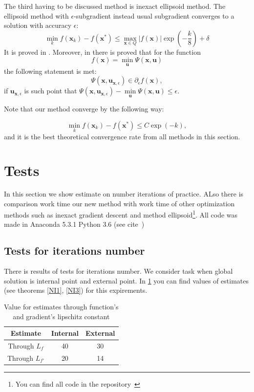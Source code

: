 \documentclass[12pt]{article}
\begin{document}
The third having to be discussed method is inexact ellipsoid method. The ellipsoid method with $\epsilon$-subgradient instead usual subgradient converges to a solution with accuracy $\epsilon$:
$$\min_k f(\textbf{x}_k) - f(\textbf{x}^*)\leq \max_{\textbf{x}\in Q}|f(\textbf{x})|\exp\left(-\frac{k}{8}\right)+\delta$$
It is proved in \cite{Ellipsoids}. Moreover, in \cite{Polyak} there is proved that for the function
$$f(\textbf{x}) = \min\limits_\textbf{u}\Psi(\textbf{x},\textbf{u})$$
the following statement is met:
$$\Psi(\textbf{x},\textbf{u}_{\textbf{x},\epsilon})\in\partial_\epsilon f(\textbf{x}),$$
if $\textbf{u}_{\textbf{x},\epsilon}$ is such point that $\Psi(\textbf{x},\textbf{u}_{\textbf{x},\epsilon}) - \min\limits_\textbf{u}\Psi(\textbf{x},\textbf{u})\leq\epsilon$.

Note that our method converge by the following way:

$$\min_k f(\textbf{x}_k) - f(\textbf{x}^*) \leq C\exp(-k),$$
and it is the best theoretical convergence rate from all methods in this section.
\section{Tests}

In this section we show estimate on number iterations of practice. ALso there is comparison work time our new method with work time of other optimization methods such as inexact gradient descent and method ellipsoid\footnote{You can find all code in the repository~\cite{my_git}}. All code was made in Anaconda 5.3.1 Python 3.6 (see cite~\cite{conda})

\subsection{Tests for iterations number}

There is results of tests for iterations number. We consider task when global solution is internal point and external point. In \ref{table:est} you can find values of estimates (see theorems \ref{NI1}, \ref{NI3}) for this expirements.

\begin{table}[h!]
\centering
\begin{tabular}{||c|c|c||}
\hline
Estimate& Internal & External \\
\hline
Through $L_f$ & 40& 30\\
\hline
Through $L_{f'}$ & 20& 14\\
\hline
\end{tabular}
\caption{Value for estimates through function's and gradient's lipschitz constant}
\label{table:est}
\end{table}
\end{document}
